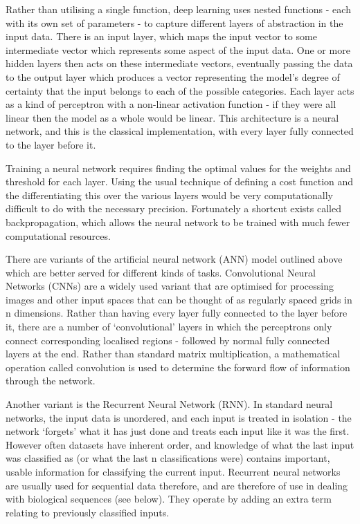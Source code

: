 Rather than utilising a single function, deep learning uses nested functions - each with its own set of parameters - to capture different layers of abstraction in the input data. There is an input layer, which maps the input vector to some intermediate vector which represents some aspect of the input data. One or more hidden layers then acts on these intermediate vectors, eventually passing the data to the output layer which produces a vector representing the model's degree of certainty that the input belongs to each of the possible categories. Each layer acts as a kind of perceptron with a non-linear activation function - if they were all linear then the model as a whole would be linear. This architecture is a neural network, and this is the classical implementation, with every layer fully connected to the layer before it.

Training a neural network requires finding the optimal values for the weights and threshold for each layer. Using the usual technique of defining a cost function and the differentiating this over the various layers would be very computationally difficult to do with the necessary precision. Fortunately a shortcut exists called backpropagation, which allows the neural network to be trained with much fewer computational resources.

There are variants of the artificial neural network (ANN) model outlined above which are better served for different kinds of tasks. Convolutional Neural Networks (CNNs) are a widely used variant that are optimised for processing images and other input spaces that can be thought of as regularly spaced grids in n dimensions. Rather than having every layer fully connected to the layer before it, there are a number of `convolutional' layers in which the perceptrons only connect corresponding localised regions - followed by normal fully connected layers at the end. Rather than standard matrix multiplication, a mathematical operation called convolution is used to determine the forward flow of information through the network.

Another variant is the Recurrent Neural Network (RNN). In standard neural networks, the input data is unordered, and each input is treated in isolation - the network `forgets' what it has just done and treats each input like it was the first. However often datasets have inherent order, and knowledge of what the last input was classified as (or what the last n classifications were) contains important, usable information for classifying the current input. Recurrent neural networks are usually used for sequential data therefore, and are therefore of use in dealing with biological sequences (see below). They operate by adding an extra term relating to previously classified inputs. 

